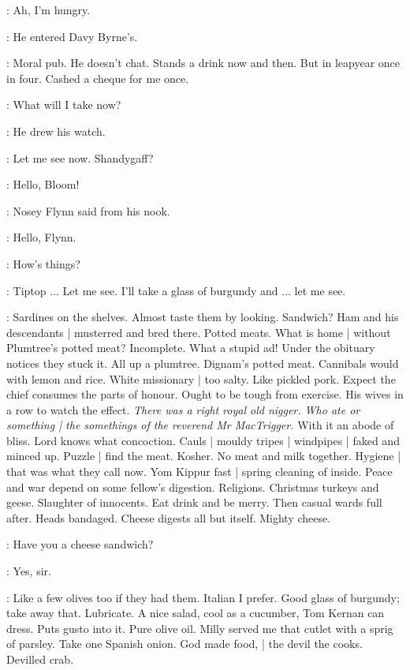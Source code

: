 \BloomInt:
Ah, I'm hungry.

:
He entered Davy Byrne's.

\BloomInt:
Moral pub.
He doesn't chat.
Stands a drink now and then.
But in leapyear once in four.
Cashed a cheque for me once.

\BloomInt:
What will I take now?

:
He drew his watch.

\BloomInt:
Let me see now.
Shandygaff?

\nosey:
Hello, Bloom!

:
Nosey Flynn said from his nook.

\Bloom:
Hello,
Flynn.

\nosey:
How's things?

\Bloom:
Tiptop ...
Let me see.
I'll take a glass of burgundy and ...
let me see.

\BloomInt:
Sardines on the shelves.
Almost taste them by looking.
Sandwich?
Ham and his descendants |
musterred and bred there.
Potted meats.
What is home |
without Plumtree's potted meat?
Incomplete.
What a stupid ad!
Under the obituary notices they stuck it.
All up a plumtree.
Dignam's potted meat.
Cannibals would with lemon and rice.
White missionary |
too salty.
Like pickled pork.
Expect the chief consumes the parts of honour.
Ought to be tough from exercise.
His wives in a row to watch the effect.
\emph{There was a right royal old nigger.
Who ate or something |
the somethings of the reverend Mr MacTrigger.}
With it an abode of bliss.
Lord knows what concoction.
Cauls |
mouldy tripes |
windpipes |
faked and minced up.
Puzzle |
find the meat.
Kosher.
No meat and milk together.
Hygiene |
that was what they call now.
Yom Kippur fast |
spring cleaning of inside.
Peace and war depend on some fellow's digestion.
Religions.
Christmas turkeys and geese.
Slaughter of innocents.
Eat drink and be merry.
Then casual wards full after.
Heads bandaged.
Cheese digests all but itself.
Mighty cheese.

\Bloom:
Have you a cheese sandwich?

\curate:
Yes, sir.

\BloomInt:
Like a few olives too if they had them.
Italian I prefer.
Good glass of burgundy;
take away that.
Lubricate.
A nice salad,
cool as a cucumber,
Tom Kernan can dress.
Puts gusto into it.
Pure olive oil.
Milly served me that cutlet with a sprig of parsley.
Take one Spanish onion.
God made food, |
the devil the cooks.
Devilled crab.

